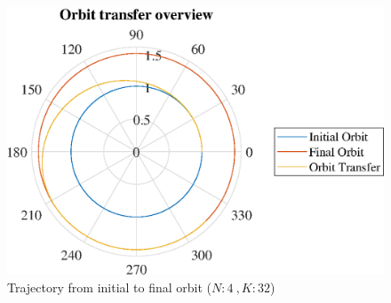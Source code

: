 \documentclass[]{article}
\begin{document}
	\begin{figure}
		\centering
		\includegraphics[scale=0.75]{orbit_N4_K32_C3_mf.eps}
		\caption{Trajectory from initial to final orbit (\(N:4\ , K:32\))}
		\label{fig:orbit_N4_K32_C3_mf}
	\end{figure}
	\FloatBarrier
\end{document}
